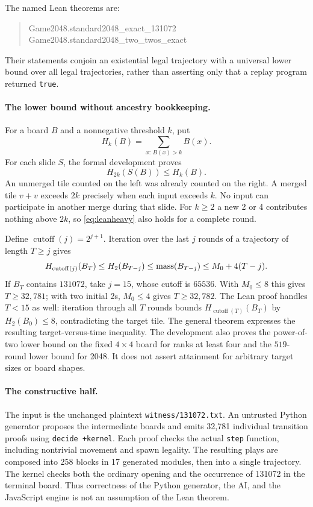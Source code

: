 The named Lean theorems are:
\begin{quote}\small\ttfamily
Game2048.standard2048\_exact\_131072\\
Game2048.standard2048\_two\_twos\_exact
\end{quote}
Their statements conjoin an
existential legal trajectory with a universal lower bound over all legal
trajectories, rather than asserting only that a replay program returned
\texttt{true}.

\paragraph{The lower bound without ancestry bookkeeping.}
For a board $B$ and a nonnegative threshold $k$, put
\[
 H_k(B)=\sum_{x:\,B(x)>k}B(x).
\]
For each slide $S$, the formal development proves
\begin{equation}\label{eq:leanheavy}
 H_{2k}(S(B))\le H_k(B).
\end{equation}
An unmerged tile counted on the left was already counted on the right.
A merged tile $v+v$ exceeds $2k$ precisely when each input exceeds $k$.
No input can participate in another merge during that slide. For $k\ge2$
a new 2 or 4 contributes nothing above $2k$, so
\eqref{eq:leanheavy} also holds for a complete round.

Define $\operatorname{cutoff}(j)=2^{j+1}$. Iteration over the last $j$
rounds of a trajectory of length $T\ge j$ gives
\[
 H_{\operatorname{cutoff}(j)}(B_T)
 \le H_2(B_{T-j})
 \le \mathrm{mass}(B_{T-j})
 \le M_0+4(T-j).
\]
If $B_T$ contains $131072$, take $j=15$, whose cutoff is $65536$.
With $M_0\le8$ this gives $T\ge32{,}781$; with two initial 2s,
$M_0\le4$ gives $T\ge32{,}782$. The Lean proof handles $T<15$ as
well: iteration through all $T$ rounds bounds
$H_{\operatorname{cutoff}(T)}(B_T)$ by $H_2(B_0)\le8$, contradicting
the target tile. The general theorem 
expresses the resulting target-versus-time inequality. The development
also proves the power-of-two lower bound on the fixed $4\times4$ board
for ranks at least four and the $519$-round lower bound for 2048.
It does not assert attainment for arbitrary target sizes or board shapes.

\paragraph{The constructive half.}
The input is the unchanged plaintext \texttt{witness/131072.txt}.
An untrusted Python generator proposes the intermediate boards and emits
32,781 individual transition proofs using \texttt{decide +kernel}.
Each proof checks the actual \texttt{step} function, including nontrivial
movement and spawn legality. The resulting plays are composed into
258 blocks in 17 generated modules, then into a single trajectory.
The kernel checks both the ordinary opening and the occurrence of 131072
in the terminal board. Thus correctness of the Python generator, the AI,
and the JavaScript engine is not an assumption of the Lean theorem.

